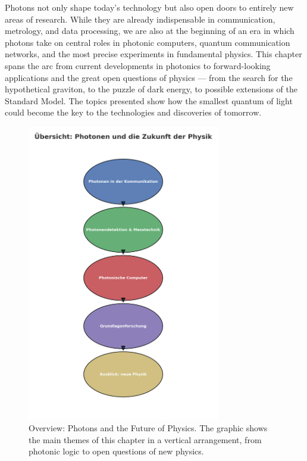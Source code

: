 Photons not only shape today’s technology but also open doors to entirely new areas of research.  
While they are already indispensable in communication, metrology, and data processing, we are also at the beginning of an era in which photons take on central roles in photonic computers, quantum communication networks, and the most precise experiments in fundamental physics.  
This chapter spans the arc from current developments in photonics to forward-looking applications and the great open questions of physics — from the search for the hypothetical graviton, to the puzzle of dark energy, to possible extensions of the Standard Model.  
The topics presented show how the smallest quantum of light could become the key to the technologies and discoveries of tomorrow.
\newpage
\noindent
\begin{figure}[H]
	\centering
	\includegraphics[width=0.75\textwidth]{bilder/kapitel_VII_uebersicht.png}
	\caption[Overview Chapter~VII]{Overview: Photons and the Future of Physics. 
		The graphic shows the main themes of this chapter in a vertical arrangement, 
		from photonic logic to open questions of new physics.}
	\label{fig:kapitel_VII_uebersicht}
\end{figure}

